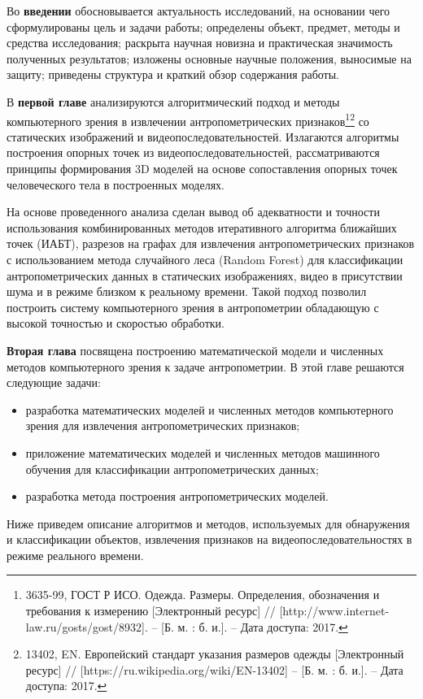 Во {\textbf{введении}} обосновывается актуальность исследований, на основании чего сформулированы цель и задачи работы; определены объект, предмет, методы и средства исследования; раскрыта научная новизна и практическая значимость полученных результатов; изложены основные научные положения, выносимые на защиту; приведены структура и краткий обзор содержания работы.

В \textbf {первой главе} анализируются алгоритмический подход и методы компьютерного зрения в извлечении антропометрических признаков\footnote{3635-99, ГОСТ Р ИСО. Одежда. Размеры. Определения, обозначения и требования к измерению [Электронный ресурс] // [http://www.internet-law.ru/gosts/gost/8932]. -- [Б. м. : б. и.]. -- Дата доступа: 2017.}\footnote{13402, EN. Европейский стандарт указания размеров одежды [Электронный ресурс] // [https://ru.wikipedia.org/wiki/EN-13402] -- [Б. м. : б. и.]. -- Дата доступа: 2017.} со статических изображений и видеопоследовательностей. Излагаются алгоритмы построения опорных точек из видеопоследовательностей, рассматриваются принципы формирования 3D моделей на основе сопоставления опорных точек человеческого тела в построенных моделях. 

На основе проведенного анализа сделан вывод об адекватности и точности использования комбинированных методов итеративного алгоритма ближайших точек (ИАБТ), разрезов на графах для извлечения антропометрических признаков с использованием метода случайного леса (Random Forest) для классификации антропометрических данных в статических изображениях, видео в присутствии шума и в режиме близком к реальному времени. Такой подход позволил построить систему компьютерного зрения в антропометрии обладающую с высокой точностью и скоростью обработки.

 \textbf{Вторая глава} посвящена построению математической модели и численных методов компьютерного зрения к задаче антропометрии. В этой главе решаются следующие задачи:
\begin{itemize}
	\item разработка математических моделей и численных методов компьютерного зрения для извлечения антропометрических признаков;
	\item приложение математических моделей и численных методов машинного обучения для классификации антропометрических данных;
	\item разработка метода построения антропометрических моделей.
\end{itemize}

Ниже приведем описание алгоритмов и методов, используемых для обнаружения и классификации объектов, извлечения признаков на видеопоследовательностях в режиме реального времени.

